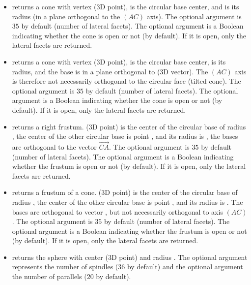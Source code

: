\begin{itemize}
    \item {} returns a cone with vertex  (3D point),  is the circular base center, and  is its radius (in a plane orthogonal to the $(AC)$ axis). The optional argument  is $35$ by default (number of lateral facets). The optional argument  is a Boolean indicating whether the cone is open or not (\false by default). If it is open, only the lateral facets are returned.

    \item {} returns a cone with vertex  (3D point),  is the circular base center,  is its radius, and the base is in a plane orthogonal to  (3D vector). The $(AC)$ axis is therefore not necessarily orthogonal to the circular face (tilted cone). The optional argument  is $35$ by default (number of lateral facets). The optional argument  is a Boolean indicating whether the cone is open or not (\false by default). If it is open, only the lateral facets are returned.

    \item {} returns a right frustum.  (3D point) is the center of the circular base of radius , the center of the other circular base is point , and its radius is , the bases are orthogonal to the vector $\vec{CA}$. The optional argument  is $35$ by default (number of lateral facets). The optional argument  is a Boolean indicating whether the frustum is open or not (\false by default). If it is open, only the lateral facets are returned.

    \item {} returns a frustum of a cone.  (3D point) is the center of the circular base of radius , the center of the other circular base is point , and its radius is . The bases are orthogonal to vector , but not necessarily orthogonal to axis $(AC)$. The optional argument  is $35$ by default (number of lateral facets). The optional argument  is a Boolean indicating whether the frustum is open or not (\false by default). If it is open, only the lateral facets are returned.

    \item {} returns the sphere with center  (3D point) and radius . The optional argument  represents the number of spindles ($36$ by default) and the optional argument  the number of parallels ($20$ by default).
\end{itemize}

